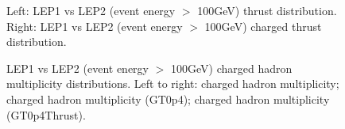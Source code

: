 \begin{figure}[H]
\centering
{}\hfill
{}\hfill %
\caption{Left: LEP1 vs LEP2 (event energy $>$ 100GeV) thrust distribution. Right: LEP1 vs LEP2 (event energy $>$ 100GeV) charged thrust distribution.}
\end{figure}

\begin{figure}[H]
\centering
{}\hfill
{}\hfill
{}\hfill
\caption{LEP1 vs LEP2 (event energy $>$ 100GeV) charged hadron multiplicity distributions. Left to right: charged hadron multiplicity; charged hadron multiplicity (GT0p4); charged hadron multiplicity (GT0p4Thrust).}
\end{figure}

